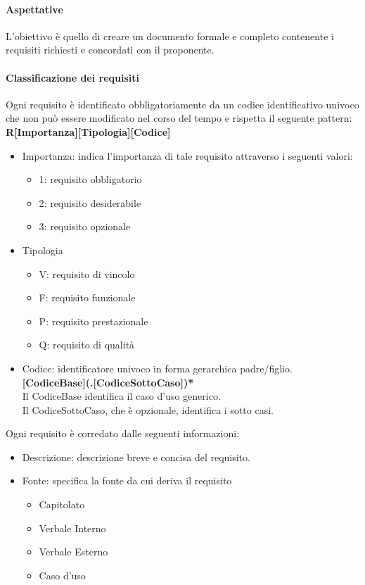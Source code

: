 \paragraph{Aspettative}
L'obiettivo è quello di creare un documento formale e completo contenente i requisiti richiesti e concordati con il proponente.

\paragraph{Classificazione dei requisiti}
Ogni requisito è identificato obbligatoriamente da un codice identificativo univoco che non può essere modificato nel corso del tempo e rispetta il seguente pattern: \\
\textbf{R[Importanza][Tipologia][Codice]}
  
\begin{itemize}
  \item Importanza: indica l'importanza di tale requisito attraverso i seguenti valori:
  \begin{itemize}
  	\item 1: requisito obbligatorio
  	\item 2: requisito desiderabile
  	\item 3: requisito opzionale
  \end{itemize}
  \item Tipologia
  \begin{itemize}
  	\item V: requisito di vincolo
  	\item F: requisito funzionale
  	\item P: requisito prestazionale
  	\item Q: requisito di qualità
  \end{itemize}
  \item Codice: identificatore univoco in forma gerarchica padre/figlio. \\
\textbf{[CodiceBase](.[CodiceSottoCaso])*} \\
  
  Il CodiceBase identifica il caso d'uso generico. \\
  Il CodiceSottoCaso, che è opzionale, identifica i sotto casi.
\end{itemize}

Ogni requisito è corredato dalle seguenti informazioni:
\begin{itemize}
	\item Descrizione: descrizione breve e concisa del requisito.
	\item Fonte: specifica la fonte da cui deriva il requisito
	\begin{itemize}
		\item Capitolato
		\item Verbale Interno
		\item Verbale Esterno
		\item Caso d'uso
	\end{itemize}
\end{itemize}


